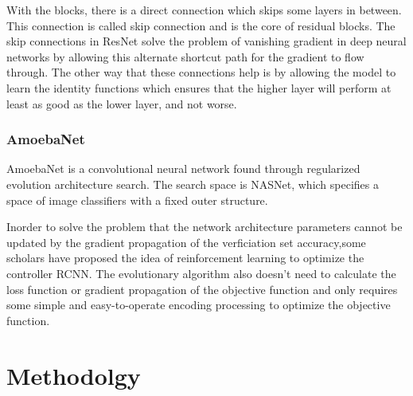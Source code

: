 \documentclass[12pt]{report}
\begin{document}
With the blocks, there is a direct connection which skips some layers in between. This connection is called skip connection and is the core of residual blocks.
The skip connections in ResNet solve the problem of vanishing gradient in deep neural networks by allowing this alternate shortcut path for the gradient to flow through. The other way that these connections help is by allowing the model to learn the identity functions which ensures that the higher layer will perform at least as good as the lower layer, and not worse\cite{Res}.

\subsection{AmoebaNet}
AmoebaNet is a convolutional neural network found through regularized evolution architecture search. The search space is NASNet, which specifies a space of image classifiers with a fixed outer structure\cite{Amoeba}. 

Inorder to solve the problem that the network architecture parameters cannot be updated by the gradient propagation of the verficiation set accuracy,some scholars have proposed the idea of reinforcement learning to optimize the controller RCNN. The evolutionary algorithm also doesn't need to calculate the loss function or gradient propagation of the objective function and only requires some simple and easy-to-operate encoding processing to optimize the objective function\cite{Am}.


































\chapter{Methodolgy}
\end{document}
